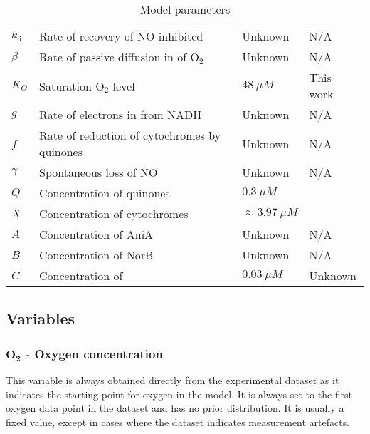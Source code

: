 \begin{table}[tbp]
\begin{center}
\begin{tabular}{>{\centering}m{1.7cm}>{\centering}m{6.2cm}>{\centering}m{2.5cm}>{\centering}m{2.8cm}}
$k_6$ & Rate of recovery of NO inhibited \cbbthree{} & Unknown & N/A
\tabularnewline\noalign{\smallskip}\hline\noalign{\smallskip}

$\beta$ & Rate of passive diffusion in of O$_{\textrm{2}}$ & Unknown & N/A
\tabularnewline\noalign{\smallskip}\hline\noalign{\smallskip}

$K_O$ & Saturation O$_{\textrm{2}}$ level & $48~\mu M$ & This work
\tabularnewline\noalign{\smallskip}\hline\noalign{\smallskip}

$g$ & Rate of electrons in from NADH & Unknown & N/A
\tabularnewline\noalign{\smallskip}\hline\noalign{\smallskip}

$f$ & Rate of reduction of cytochromes by quinones & Unknown & N/A
\tabularnewline\noalign{\smallskip}\hline\noalign{\smallskip}

$\gamma$ & Spontaneous loss of NO & Unknown & N/A
\tabularnewline\noalign{\smallskip}\hline\noalign{\smallskip}

$Q$ & Concentration of quinones & $0.3~\mu M$ & \citet{Hedrick1986}
\tabularnewline\noalign{\smallskip}\hline\noalign{\smallskip}

$X$ & Concentration of cytochromes & $\approx3.97~\mu M$ & \citet{Deeudom2007}
\tabularnewline\noalign{\smallskip}\hline\noalign{\smallskip}

$A$ & Concentration of AniA & Unknown & N/A
\tabularnewline\noalign{\smallskip}\hline\noalign{\smallskip}

$B$ & Concentration of NorB & Unknown & N/A
\tabularnewline\noalign{\smallskip}\hline\noalign{\smallskip}

$C$ & Concentration of \cbbthree{} & $0.03~\mu M$ & Unknown
\tabularnewline
\bottomrule
\end{tabular}
\caption{Model parameters
\label{tab:ps}}
\end{center}
\end{table}

\subsection*{Variables}
\subsubsection*{$\mathbf{O_2}$ {\bf- Oxygen concentration}}
This variable is always obtained directly from the experimental dataset as it indicates the starting point for oxygen in the model. It is always set to the first oxygen data point in the dataset and has no prior distribution. It is usually a fixed value, except in cases where the dataset indicates measurement artefacts.

